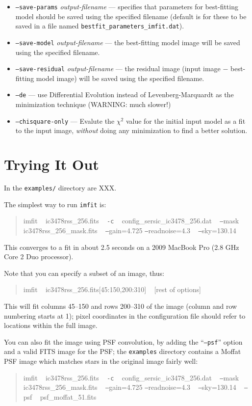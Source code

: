 \documentclass[10pt]{article}
\newcommand{\imfit}{\texttt{imfit}}
\begin{document}
\begin{itemize}
\bigskip

\item \texttt{--save-params} \textit{output-filename} --- specifies that parameters 
for best-fitting model should be saved using the specified filename (default is
for these to be saved in a file named \texttt{bestfit\_parameters\_imfit.dat}).
\item \texttt{--save-model} \textit{output-filename} --- the best-fitting model image
will be saved using the specified filename.
\item \texttt{--save-residual} \textit{output-filename} --- the residual image (input
image $-$ best-fitting model image) will be saved using the specified filename.

\bigskip
\item \texttt{--de} --- use Differential Evolution instead of Levenberg-Marquardt as
the minimization technique (WARNING: much slower!)
\item \texttt{--chisquare-only} --- Evalute the $\chi^2$ value for the initial input
model as a fit to the input image, \textit{without} doing any minimization to find
a better solution.
\end{itemize}




\section{Trying It Out}

In the \texttt{examples/} directory are XXX.

The simplest way to run \imfit{} is:
\begin{quote}
imfit ~ ic3478rss\_256.fits ~ \texttt{-c} ~ config\_sersic\_ic3478\_256.dat ~ \texttt{--}mask ~ ic3478rss\_256\_mask.fits ~ \texttt{--}gain=4.725 \texttt{--}readnoise=4.3 ~ \texttt{--}sky=130.14
\end{quote}

This converges to a fit in about 2.5 seconds on a 2009 MacBook Pro (2.8 GHz Core 2 Duo processor).

Note that you can specify a subset of an image, thus:
\begin{quote}
imfit ~ ic3478rss\_256.fits[45:150,200:310] ~ [rest of options]
\end{quote}
This will fit columns 45--150 and rows 200--310 of the image (column and row numbering starts
at 1); pixel coordinates in the configuration file should refer to locations within the
full image.

You can also fit the image using PSF convolution, by adding the ``\texttt{--psf}'' option and a
valid FITS image for the PSF; the \texttt{examples} directory contains a Moffat PSF image which
matches stars in the original image fairly well:
\begin{quote}
imfit ~ ic3478rss\_256.fits ~ \texttt{-c} ~ config\_sersic\_ic3478\_256.dat ~ \texttt{--}mask ~ ic3478rss\_256\_mask.fits ~ \texttt{--}gain=4.725 \texttt{--}readnoise=4.3 ~ \texttt{--}sky=130.14 ~ \texttt{--}psf ~ psf\_moffat\_51.fits
\end{quote}
\end{document}

